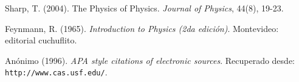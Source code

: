 \documentclass{article}
\begin{document}
\begingroup
\renewcommand{\section}[2]{}

\begin{thebibliography}{}

 Sharp, T. (2004). The Physics of Physics. \textit{Journal of Physics}, 44(8), 19-23.

 Feynmann, R. (1965). \textit{Introduction to Physics (2da edición)}. Montevideo: editorial cuchuflito.

 Anónimo (1996). \textit{APA style citations of electronic sources}. Recuperado desde: \texttt{http://www.cas.usf.edu/}.

\end{thebibliography}
\endgroup







        
\end{document}
